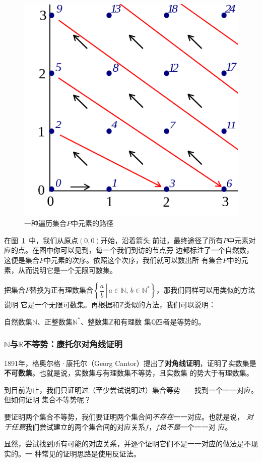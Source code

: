 \begin{figure}[H]
    \centering
    \includegraphics[width=0.4\linewidth]{fig/pairing_natural.png}
    \caption{一种遍历集合$P$中元素的路径}\label{fig:pairing_natural}
\end{figure}

在图~\ref{fig:pairing_natural}~中，我们从原点$\left( 0,0 \right) $开始，沿着箭头
前进，最终途径了所有$P$中元素对应的点。在图中你可以见到，每一个我们到访的节点旁
边都标注了一个自然数，这便是集合$P$中元素的次序。依照这个次序，我们就可以数出所
有集合$P$中的元素，从而说明它是一个无限可数集。

把集合$P$替换为正有理数集合$\left\{\left. \dfrac{a}{b}\,\right|\, a\in 
\mathbb{N},\,b\in\mathbb{N}^\ast \right\} $，那我们同样可以用类似的方法说明
它是一个无限可数集。再根据和$\mathbb{Z}$类似的方法，我们可以说明：

\begin{rawthm}
    自然数集$\mathbb{N}$、正整数集$\mathbb{N}^\ast$、整数集$\mathbb{Z}$和有理数
    集$\mathbb{Q}$四者是等势的。
\end{rawthm}

\subsubsection{$\mathbb{N}$与$\mathbb{R}$不等势：康托尔对角线证明}

1891年，格奥尔格·康托尔（Georg Cantor）提出了\textbf{对角线证明}，证明了实数集是\textbf{不可数集}。也就是说，实数集与有理数集不等势，且实数集
的势大于有理数集。

到目前为止，我们只证明过（至少尝试说明过）集合等势——找到一个一一对应。但如何证明
集合不等势呢？

要证明两个集合不等势，我们要证明两个集合间\emph{不存在}一一对应。也就是说，
\emph{对于任意}我们尝试建立的两个集合间的对应关系$f$，$f$\emph{总不是}一个一一对
应。

显然，尝试找到所有可能的对应关系，并逐个证明它们不是一一对应的做法是不现实的。一
种常见的证明思路是使用反证法。%


